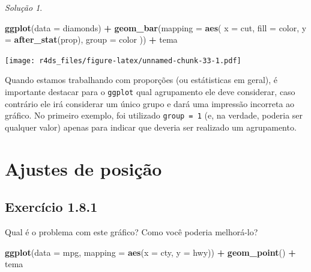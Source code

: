 \documentclass[
]{latex/krantz}
\newenvironment{Shaded}{\begin{snugshade}}{\end{snugshade}}
\newcommand{\AttributeTok}[1]{\textcolor[rgb]{0.13,0.29,0.53}{#1}}
\newcommand{\FunctionTok}[1]{\textcolor[rgb]{0.13,0.29,0.53}{\textbf{#1}}}
\newcommand{\NormalTok}[1]{#1}
\newcommand{\SpecialCharTok}[1]{\textcolor[rgb]{0.81,0.36,0.00}{\textbf{#1}}}
\theoremstyle{definition}
\theoremstyle{definition}
\theoremstyle{definition}
\theoremstyle{definition}
\theoremstyle{remark}
\newtheorem*{solution}{Solução}
\begin{document}
\begin{solution}
\leavevmode

\begin{Shaded}
\begin{Highlighting}[]
\FunctionTok{ggplot}\NormalTok{(}\AttributeTok{data =}\NormalTok{ diamonds) }\SpecialCharTok{+}
    \FunctionTok{geom\_bar}\NormalTok{(}\AttributeTok{mapping =} \FunctionTok{aes}\NormalTok{(}
        \AttributeTok{x =}\NormalTok{ cut, }
        \AttributeTok{fill =}\NormalTok{ color, }
        \AttributeTok{y =} \FunctionTok{after\_stat}\NormalTok{(prop), }
        \AttributeTok{group =}\NormalTok{ color}
\NormalTok{    )) }\SpecialCharTok{+}
\NormalTok{    tema}
\end{Highlighting}
\end{Shaded}

\texttt{[image: r4ds\_files/figure-latex/unnamed-chunk-33-1.pdf]}

Quando estamos trabalhando com proporções (ou estátisticas em geral), é importante destacar para o \texttt{ggplot} qual agrupamento ele deve considerar, caso contrário ele irá considerar um único grupo e dará uma impressão incorreta ao gráfico. No primeiro exemplo, foi utilizado \texttt{group\ =\ 1} (e, na verdade, poderia ser qualquer valor) apenas para indicar que deveria ser realizado um agrupamento.

\end{solution}

\hypertarget{ajustes-de-posiuxe7uxe3o}{%
\section{Ajustes de posição}\label{ajustes-de-posiuxe7uxe3o}}

\hypertarget{exr1-8-1}{%
\subsection*{Exercício 1.8.1}\label{exr1-8-1}}

Qual é o problema com este gráfico? Como você poderia melhorá-lo?

\begin{Shaded}
\begin{Highlighting}[]
\FunctionTok{ggplot}\NormalTok{(}\AttributeTok{data =}\NormalTok{ mpg, }\AttributeTok{mapping =} \FunctionTok{aes}\NormalTok{(}\AttributeTok{x =}\NormalTok{ cty, }\AttributeTok{y =}\NormalTok{ hwy)) }\SpecialCharTok{+}
    \FunctionTok{geom\_point}\NormalTok{() }\SpecialCharTok{+}
\NormalTok{    tema}
\end{Highlighting}
\end{Shaded}
\end{document}

